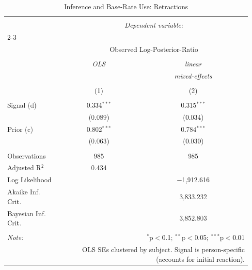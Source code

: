 
\begin{table}[!htbp] \centering 
  \caption{Inference and Base-Rate Use: Retractions} 
  \label{} 
\begin{tabular}{@{\extracolsep{5pt}}lcc} 
\\[-1.8ex]\hline 
\hline \\[-1.8ex] 
 & \multicolumn{2}{c}{\textit{Dependent variable:}} \\ 
\cline{2-3} 
\\[-1.8ex] & \multicolumn{2}{c}{Observed Log-Posterior-Ratio} \\ 
\\[-1.8ex] & \textit{OLS} & \textit{linear} \\ 
 & \textit{} & \textit{mixed-effects} \\ 
\\[-1.8ex] & (1) & (2)\\ 
\hline \\[-1.8ex] 
 Signal (d) & 0.334$^{***}$ & 0.315$^{***}$ \\ 
  & (0.089) & (0.034) \\ 
  Prior (c) & 0.802$^{***}$ & 0.784$^{***}$ \\ 
  & (0.063) & (0.030) \\ 
 \hline \\[-1.8ex] 
Observations & 985 & 985 \\ 
Adjusted R$^{2}$ & 0.434 &  \\ 
Log Likelihood &  & $-$1,912.616 \\ 
Akaike Inf. Crit. &  & 3,833.232 \\ 
Bayesian Inf. Crit. &  & 3,852.803 \\ 
\hline 
\hline \\[-1.8ex] 
\textit{Note:}  & \multicolumn{2}{r}{$^{*}$p$<$0.1; $^{**}$p$<$0.05; $^{***}$p$<$0.01} \\ 
 & \multicolumn{2}{r}{OLS SEs clustered by subject. Signal is person-specific (accounts for initial reaction).} \\ 
\end{tabular} 
\end{table} 
